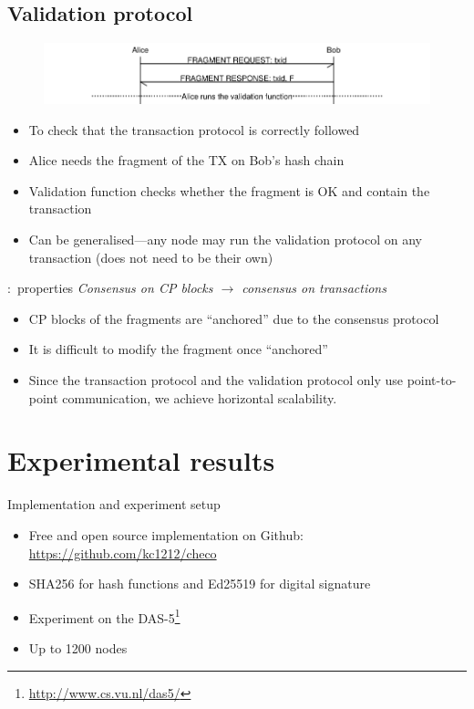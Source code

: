 \documentclass{beamer}
\begin{document}
\subsection{Validation protocol}
\begin{frame}{\subsecname}
  \begin{figure}[h]
  \includegraphics[width=1.0\textwidth]{vd-proto}
  \centering
  \end{figure}
\begin{itemize}
\item To check that the transaction protocol is correctly followed
\item Alice needs the fragment of the TX on Bob's hash chain 
\item Validation function checks whether the fragment is OK and contain the transaction
\item Can be generalised---any node may run the validation protocol on any transaction (does not need to be their own)
\end{itemize}
\end{frame}

\begin{frame}{\subsecname:~properties}
\emph{Consensus on CP blocks $\rightarrow$ consensus on transactions}
\bigskip
\begin{itemize}
  \item CP blocks of the fragments are ``anchored'' due to the consensus protocol
  \item It is difficult to modify the fragment once ``anchored''
  \item Since the transaction protocol and the validation protocol only use point-to-point communication,
  we achieve horizontal scalability.
\end{itemize}
\end{frame}

\section{Experimental results}
\begin{frame}{Implementation and experiment setup}
  \begin{itemize}
    \item Free and open source implementation on Github:
      \url{https://github.com/kc1212/checo}
    \item SHA256 for hash functions and Ed25519 for digital signature
    \item Experiment on the DAS-5\footnote{\url{http://www.cs.vu.nl/das5/}}
    \item Up to 1200 nodes
  \end{itemize}
\end{frame}
\end{document}
